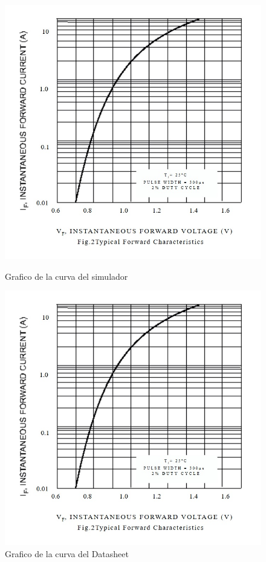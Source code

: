 \documentclass[chaptersright]{informeutn}
\begin{document}
    
                \begin{figure}[!h]
                    \centering
                    \begin{minipage}[b]{0.4\textwidth}
                        \includegraphics[width=1.1\linewidth]{pictures/Curva_Datash_Si.jpg}
                        \caption{Grafico de la curva del simulador}
                    \end{minipage}
                    \hfill
                    \begin{minipage}[b]{0.4\textwidth}
                        \includegraphics[width=1.1\linewidth]{pictures/Curva_Datash_Si.jpg}
                        \caption{Grafico de la curva del Datasheet}
                    \end{minipage}
                \end{figure}
    
\end{document}
